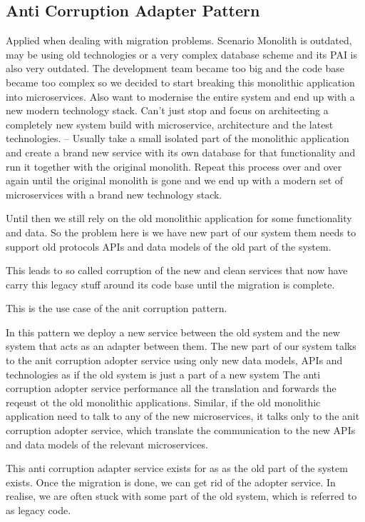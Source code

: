 \documentclass[a4paper, 11pt]{book}
\begin{document}
    \subsection{Anti Corruption Adapter Pattern}
    Applied when dealing with migration problems.
    Scenario
    Monolith is outdated, may be using old technologies or a very complex database scheme and its PAI is also very outdated.
    The development team became too big and the code base became too complex so we decided to start breaking this monolithic application into microservices.
    Also want to modernise the entire system and end up with a new modern technology stack.
    Can't just stop and focus on architecting a completely new system build with microservice, architecture and the latest technologies.
    -- Usually take a small isolated part of the monolithic application and create a brand new service with its own database for that functionality and run it together with the original monolith.
    Repeat this process over and over again until the original monolith is gone and we end up with a modern set of microservices with a brand new technology stack.

    Until then we still rely on the old monolithic application for some functionality and data.
    So the problem here is we have new part of our system them needs to support old protocols APIs and data models of the old part of the system.

    This leads to so called corruption of the new and clean services that now have carry this legacy stuff around its code base until the migration is complete.

    This is the use case of the anit corruption pattern.

    In this pattern we deploy a new service between the old system and the new system that acts as an adapter between them.
    The new part of our system talks to the anit corruption adopter service using only new data models, APIs and technologies as if the old system is just a part of a new system
    The anti corruption adopter service performance all the translation and forwards the reqeust ot the old monolithic applications.
    Similar, if the old monolithic application need to talk to any of the new microservices, it talks only to the anit corruption adopter service, which translate the communication to the new APIs and data models of the relevant microservices.

    This anti corruption adapter service exists for as as the old part of the system exists.
    Once the migration is done, we can get rid of the adopter service.
    In realise, we are often stuck with some part of the old system, which is referred to as legacy code.
\end{document}
